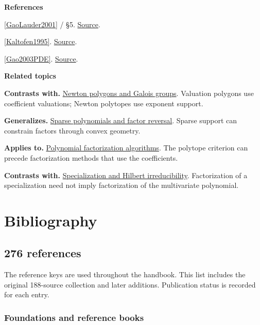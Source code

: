 \documentclass[11pt,a4paper,oneside,openany]{book}
\newenvironment{sources}{\par\smallskip\begingroup\footnotesize\color{atlasgray}\leftskip=10pt\setlength{\parskip}{2pt}}{\par\endgroup\smallskip}
\begin{document}
\begin{sources}
\textbf{References}\par\smallskip
\noindent\hyperlink{ref:GaoLauder2001}{[GaoLauder2001]} / §5.  \href{https://link.springer.com/article/10.1007/s00454-001-0024-0}{Source}.\par
\noindent\hyperlink{ref:Kaltofen1995}{[Kaltofen1995]}.  \href{https://www.sciencedirect.com/science/article/pii/S0022000085710239}{Source}.\par
\noindent\hyperlink{ref:Gao2003PDE}{[Gao2003PDE]}.  \href{https://doi.org/10.1090/S0025-5718-02-01428-X}{Source}.\par
\end{sources}\color{black}
\par\medskip\begingroup\footnotesize\setlength{\parskip}{1pt}\textbf{\sffamily\color{atlasgreen}Related topics}\par
\color{black}\textbf{Contrasts with.} \hyperlink{article:newton-polygons}{Newton polygons and Galois groups}. Valuation polygons use coefficient valuations; Newton polytopes use exponent support.\par
\color{black}\textbf{Generalizes.} \hyperlink{article:sparse-gaps}{Sparse polynomials and factor reversal}. Sparse support can constrain factors through convex geometry.\par
\color{black}\textbf{Applies to.} \hyperlink{article:factorization-algorithms}{Polynomial factorization algorithms}. The polytope criterion can precede factorization methods that use the coefficients.\par
\color{black}\textbf{Contrasts with.} \hyperlink{article:specialization}{Specialization and Hilbert irreducibility}. Factorization of a specialization need not imply factorization of the multivariate polynomial.\par
\endgroup
\backmatter\setcounter{secnumdepth}{-1}\part{Bibliography}\chapter{276 references}
The reference keys are used throughout the handbook. This list includes the original 188-source collection and later additions. Publication status is recorded for each entry.\par\medskip
{}\section{Foundations and reference books}
\end{document}
